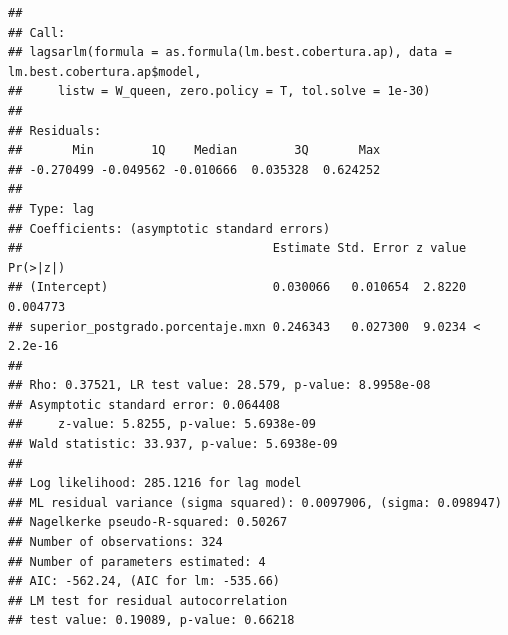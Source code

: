 \documentclass[12pt,]{book}
\newenvironment{Shaded}{\begin{snugshade}}{\end{snugshade}}
\newcommand{\KeywordTok}[1]{\textcolor[rgb]{0.13,0.29,0.53}{\textbf{#1}}}
\newcommand{\DataTypeTok}[1]{\textcolor[rgb]{0.13,0.29,0.53}{#1}}
\newcommand{\FloatTok}[1]{\textcolor[rgb]{0.00,0.00,0.81}{#1}}
\newcommand{\CommentTok}[1]{\textcolor[rgb]{0.56,0.35,0.01}{\textit{#1}}}
\newcommand{\OperatorTok}[1]{\textcolor[rgb]{0.81,0.36,0.00}{\textbf{#1}}}
\newcommand{\NormalTok}[1]{#1}
\begin{document}
\begin{verbatim}
## 
## Call:
## lagsarlm(formula = as.formula(lm.best.cobertura.ap), data = lm.best.cobertura.ap$model, 
##     listw = W_queen, zero.policy = T, tol.solve = 1e-30)
## 
## Residuals:
##       Min        1Q    Median        3Q       Max 
## -0.270499 -0.049562 -0.010666  0.035328  0.624252 
## 
## Type: lag 
## Coefficients: (asymptotic standard errors) 
##                                   Estimate Std. Error z value  Pr(>|z|)
## (Intercept)                       0.030066   0.010654  2.8220  0.004773
## superior_postgrado.porcentaje.mxn 0.246343   0.027300  9.0234 < 2.2e-16
## 
## Rho: 0.37521, LR test value: 28.579, p-value: 8.9958e-08
## Asymptotic standard error: 0.064408
##     z-value: 5.8255, p-value: 5.6938e-09
## Wald statistic: 33.937, p-value: 5.6938e-09
## 
## Log likelihood: 285.1216 for lag model
## ML residual variance (sigma squared): 0.0097906, (sigma: 0.098947)
## Nagelkerke pseudo-R-squared: 0.50267 
## Number of observations: 324 
## Number of parameters estimated: 4 
## AIC: -562.24, (AIC for lm: -535.66)
## LM test for residual autocorrelation
## test value: 0.19089, p-value: 0.66218
\end{verbatim}

\begin{Shaded}
\end{Shaded}
\end{document}
